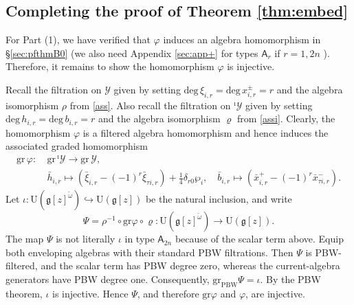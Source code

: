 \documentclass[11pt,reqno]{amsart}
\numberwithin{equation}{section}
\theoremstyle{definition}
\theoremstyle{remark}
\newcommand{\g}{\mathfrak{g}}
\newcommand{\gr}{{\mathrm{gr}}}
\newcommand{\gge}{\geqslant}
\newcommand{\Y}{{\mathscr{Y}}}
\newcommand{\Yi}{{^\imath\mathscr{Y}}}
\begin{document}
\subsection{Completing the proof of Theorem \ref{thm:embed}}

For Part (1), we have verified that $\varphi$ induces an algebra homomorphism in \S\ref{sec:pfthmB0} (we also need Appendix \ref{sec:app+} for types $\mathsf A_r$ if $r=1,2n$%
). Therefore, it remains to show the homomorphism $\varphi$ is injective. 

Recall the filtration on $\Y$ given by setting $\mathrm{deg}\,\xi_{i,r}=\mathrm{deg}\,x_{i,r}^\pm=r$ and the algebra isomorphism $\rho$ from \eqref{ass}. Also recall the filtration on $\Yi$ given by setting $\mathrm{deg}\,h_{i,r}=\mathrm{deg}\,b_{i,r}=r$ and the algebra isomorphism $\varrho$ from \eqref{assi}. Clearly, the homomorphism $\varphi$ is a filtered algebra homomorphism and hence induces the associated graded homomorphism
\begin{align*}
\mathrm{\gr}\,\varphi:~&\mathrm{\gr}\,\Yi\to \mathrm{\gr}\,\Y,\\
&\bar h_{i,r}\mapsto (\bar\xi_{i,r}-(-1)^r\bar\xi_{\tau i,r})+\tfrac14\delta_{r0}\wp_i,\quad \bar{b}_{i,r}\mapsto (\bar x_{i,r}^+-(-1)^r\bar x_{\tau i,r}^-).
\end{align*}
Let
$\iota:\mathrm U(\g[z]^{\check\omega})\hookrightarrow\mathrm U(\g[z])$ be the natural inclusion,
and write
\[
\Psi=\rho^{-1}\circ\gr\varphi\circ\varrho:
\mathrm U(\g[z]^{\check\omega})\longrightarrow\mathrm U(\g[z]).
\]
The map $\Psi$ is not literally $\iota$ in type
$\mathsf A_{2n}$ because of the scalar term above. Equip both
enveloping algebras with their standard PBW filtrations. Then $\Psi$
is PBW-filtered, and the scalar term has PBW degree zero, whereas the
current-algebra generators have PBW degree one. Consequently,
$\gr_{\mathrm{PBW}}\Psi=\iota$. By the PBW theorem, $\iota$ is injective. Hence $\Psi$, and
therefore $\gr\varphi$ and $\varphi$, are injective.
\end{document}
